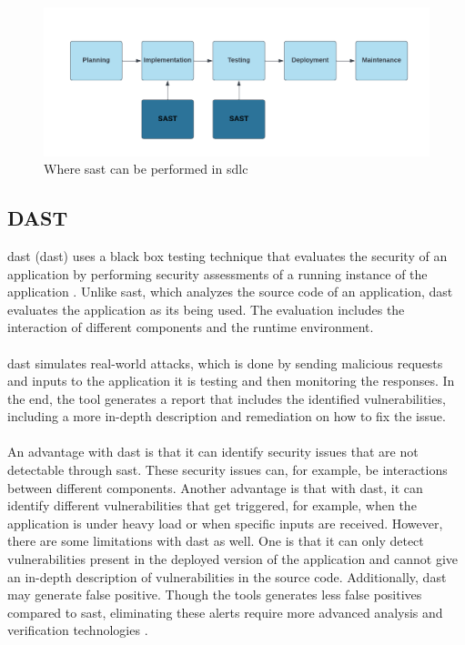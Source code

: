 \vspace{2mm}
\begin{figure}[H]
    \centering
    \includegraphics[width=0.8\columnwidth]{Images/sast.png}
    \caption{Where \acrshort{sast} can be performed in \acrshort{sdlc}}
    \label{fig: Where SAST can be performed in SDLC}
\end{figure}

\subsection{DAST}
\acrlong{dast} (\acrshort{dast}) uses a black box testing technique that evaluates the security of an application by performing security assessments of a running instance of the application \cite{dast}. Unlike \acrshort{sast}, which analyzes the source code of an application, \acrshort{dast} evaluates the application as its being used. The evaluation includes the interaction of different components and the runtime environment. 
\\~\\
\acrshort{dast} simulates real-world attacks, which is done by sending malicious requests and inputs to the application it is testing and then monitoring the responses. In the end, the tool generates a report that includes the identified vulnerabilities, including a more in-depth description and remediation on how to fix the issue. 
\\~\\
An advantage with \acrshort{dast} is that it can identify security issues that are not detectable through \acrshort{sast}. These security issues can, for example, be interactions between different components. Another advantage is that with \acrshort{dast}, it can identify different vulnerabilities that get triggered, for example, when the application is under heavy load or when specific inputs are received.
\newpage
However, there are some limitations with \acrshort{dast} as well. One is that it can only detect vulnerabilities present in the deployed version of the application and cannot give an in-depth description of vulnerabilities in the source code. Additionally, \acrshort{dast} may generate false positive. Though the tools generates less false positives compared to \acrshort{sast}, eliminating these alerts require more advanced analysis and verification technologies \cite{DastFalsePositives}.
